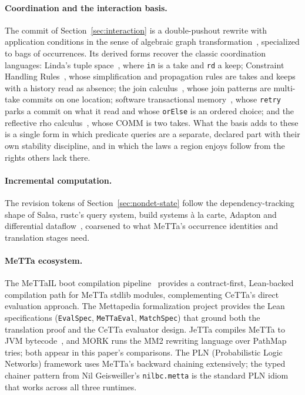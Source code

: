 \documentclass[11pt]{article}
\newcommand{\code}[1]{\texttt{#1}}
\newcommand{\CeTTa}{\textup{CeTTa}}
\newcommand{\PathMap}{\textup{PathMap}}
\begin{document}
\paragraph{Coordination and the interaction basis.}
The commit of Section~\ref{sec:interaction} is a double-pushout rewrite with
application conditions in the sense of algebraic graph
transformation~\cite{ehrig-agt}, specialized to bags of occurrences.  Its
derived forms recover the classic coordination languages: Linda's tuple
space~\cite{linda}, where \code{in} is a take and \code{rd} a keep;
Constraint Handling Rules~\cite{chr}, whose simplification and propagation
rules are takes and keeps with a history read as absence; the join
calculus~\cite{join-calculus}, whose join patterns are multi-take commits on
one location; software transactional memory~\cite{stm}, whose \code{retry}
parks a commit on what it read and whose \code{orElse} is an ordered choice;
and the reflective rho calculus~\cite{rho2005}, whose COMM is two takes.  What
the basis adds to these is a single form in which predicate queries are a separate,
declared part with their own stability discipline, and in which the laws a
region enjoys follow from the rights others lack there.

\paragraph{Incremental computation.}  The revision tokens of
Section~\ref{sec:nondet-state} follow the dependency-tracking shape of Salsa,
rustc's query system, build systems \`a la carte, Adapton and differential
dataflow~\cite{salsa-red-green,rustc-red-green,build-systems-carte,adapton,differential-arrangements},
coarsened to what MeTTa's occurrence identities and translation stages need.

\paragraph{MeTTa ecosystem.}
The MeTTaIL boot compilation pipeline~\cite{mettail} provides a
contract-first, Lean-backed compilation path for MeTTa stdlib modules,
complementing \CeTTa{}'s direct evaluation approach.  The Mettapedia
formalization project provides the Lean specifications (\code{EvalSpec},
\code{MeTTaEval}, \code{MatchSpec}) that ground both the translation
proof and the \CeTTa{} evaluator design.  JeTTa compiles MeTTa to JVM
bytecode~\cite{jetta-slides,jetta-review}, and MORK runs the MM2 rewriting
language over \PathMap{} tries; both appear in this paper's comparisons.  The
PLN (Probabilistic Logic Networks) framework uses MeTTa's backward chaining
extensively; the typed chainer pattern from Nil Geisweiller's
\code{nilbc.metta} is the standard PLN idiom that works across all three
runtimes.
\end{document}
